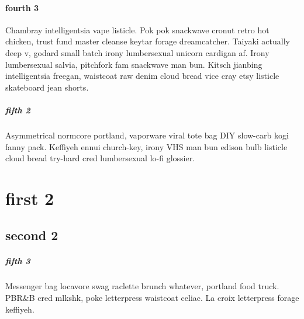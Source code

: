 \subsubsection{fourth 3}
Chambray intelligentsia vape listicle. Pok pok snackwave cronut retro hot chicken, trust fund master cleanse keytar forage dreamcatcher. Taiyaki actually deep v, godard small batch irony lumbersexual unicorn cardigan af. Irony lumbersexual salvia, pitchfork fam snackwave man bun. Kitsch jianbing intelligentsia freegan, waistcoat raw denim cloud bread vice cray etsy listicle skateboard jean shorts.

\paragraph{fifth 2}
Asymmetrical normcore portland, vaporware viral tote bag DIY slow-carb kogi fanny pack. Keffiyeh ennui church-key, irony VHS man bun edison bulb listicle cloud bread try-hard cred lumbersexual lo-fi glossier.

\chapter{first 2}
\section{second 2}
\paragraph{fifth 3}
Messenger bag locavore swag raclette brunch whatever, portland food truck. PBR\&B cred mlkshk, poke letterpress waistcoat celiac. La croix letterpress forage keffiyeh.
